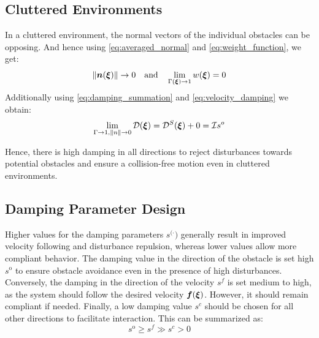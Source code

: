 \subsection{Cluttered Environments}
In a cluttered environment, the normal vectors of the individual obstacles can be opposing. And hence using \eqref{eq:averaged_normal} and \eqref{eq:weight_function}, we get: 
\begin{equation}
    \| \boldsymbol{n}(\boldsymbol{\xi}) \| \rightarrow 0
    \quad \text{and} \quad
    \lim_{\Gamma (\boldsymbol{\xi}) \rightarrow 1} w (\boldsymbol{\xi}) = 0
\end{equation}
Additionally using \eqref{eq:damping_summation} and \eqref{eq:velocity_damping} we obtain:
\begin{equation}
    \lim_{\Gamma \rightarrow 1, \| n \| \rightarrow 0} \mathcal{D}(\boldsymbol{\xi}) 
    = \mathcal{D}^S(\boldsymbol{\xi}) + 0 
    =  \mathcal{I} s^o
\end{equation}

Hence, there is high damping in all directions to reject disturbances towards potential obstacles and ensure a collision-free motion even in cluttered environments.

\subsection{Damping Parameter Design}
Higher values for the damping parameters $s^{(\cdot})$ generally result in improved velocity following and disturbance repulsion, whereas lower values allow more compliant behavior.
The damping value in the direction of the obstacle is set high $s^{\mathrm{o}}$ to ensure obstacle avoidance even in the presence of high disturbances. 
Conversely, the damping in the direction of the velocity $s^{f}$ is set medium to high, as the system should follow the desired velocity $\boldsymbol{f}(\boldsymbol{\xi})$. However, it should remain compliant if needed.
Finally, a low damping value $s^{c}$ should be chosen for all other directions to facilitate interaction.
This can be summarized as:
\begin{equation}
s^{\mathrm{o}} \geq s^{f} \gg s^{c} > 0
\end{equation}
